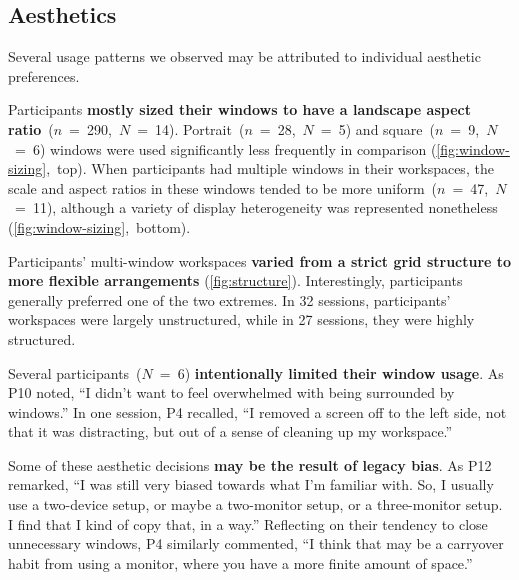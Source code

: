 \subsection{Aesthetics}
\label{sec:aesthetics}

Several usage patterns we observed may be attributed to individual aesthetic preferences. 

Participants \textbf{mostly sized their windows to have a landscape aspect ratio}~($n$~=~290,~$N$~=~14).
Portrait~($n$~=~28,~$N$~=~5)
and square~($n$~=~9,~$N$~=~6)
windows were used significantly less frequently in comparison (\autoref{fig:window-sizing},~top).
When participants had multiple windows in their workspaces, the scale and aspect ratios in these windows tended to be more uniform~($n$~=~47,~$N$~=~11), 
although a variety of display heterogeneity was represented nonetheless (\autoref{fig:window-sizing},~bottom).

Participants' multi-window workspaces \textbf{varied from a strict grid structure to more flexible arrangements} (\autoref{fig:structure}). 
Interestingly, participants generally preferred one of the two extremes.
In 32 sessions, 
participants' workspaces were largely unstructured, while in 27 sessions,
they were highly structured.

Several participants~($N$~=~6) \textbf{intentionally limited their window usage}.
As P10 noted, 
``I didn't want to feel overwhelmed with being surrounded by windows.''
In one session, P4 recalled, 
``I removed a screen off to the left side, not that it was distracting, but out of a sense of cleaning up my workspace.''

Some of these aesthetic decisions \textbf{may be the result of legacy bias}. 
As P12 remarked, ``I was still very biased towards what I'm familiar with. So, I usually use a two-device setup, or maybe a two-monitor setup, or a three-monitor setup. I find that I kind of copy that, in a way.''
Reflecting on their tendency to close unnecessary windows, P4 similarly commented, ``I think that may be a carryover habit from using a monitor, where you have a more finite amount of space.''


